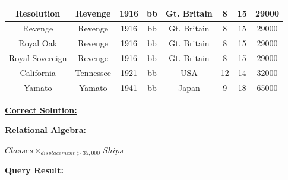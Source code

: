 \documentclass[12pt]{article}
\begin{document}
\begin{enumerate}
\begin{enumerate}[a)]
{\begin{tabular}{|c|c|c|c|c|c|c|c|}
            \hline
            Resolution  &   Revenge    &   1916    &   bb  &   Gt. Britain   &   8   &   15  &   29000\\
            \hline
            Revenge  &   Revenge    &   1916    &   bb  &   Gt. Britain   &   8   &   15  &   29000\\
            \hline
            Royal Oak  &   Revenge    &   1916    &   bb  &   Gt. Britain   &   8   &   15  &   29000\\
            \hline
            Royal Sovereign  &   Revenge    &   1916    &   bb  &   Gt. Britain   &   8   &   15  &   29000\\
            \hline
            California  &   Tennessee    &   1921    &   bb  &   USA   &   12   &   14  &   32000\\
            \hline
            Yamato  &   Yamato    &   1941    &   bb  &   Japan   &   9   &   18  &   65000\\
            \hline
        \end{tabular}}


        \bigskip

        \begin{mdframed}
            \underline{\textbf{Correct Solution:}}

            \bigskip

            \textbf{Relational Algebra:}

            \bigskip

            $Classes \bowtie_{displacement > 35,000} Ships$

            \bigskip

            \textbf{Query Result:}

            \bigskip


\end{mdframed}
\end{enumerate}
\end{enumerate}
\end{document}

